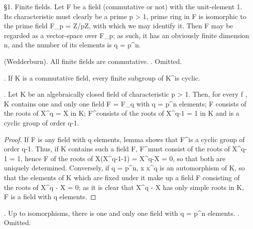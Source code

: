 
  \S 1. Finite fields. Let F be a field (commutative or not) with the
unit-element 1. Its characteristic must clearly be a prime p > 1, 
prime ring in F is isomorphic to the prime field \mathbf F_p = \mathbf Z/p\mathbf Z, with 
which we may identify it. Then F may be regarded as a vector-space over \mathbf F_p;  
as such, it has an obviously finite dimension n, and the number of its 
elements is q = p^n. 

\theorem (Wedderburn). All finite fields are commutative. 
\proof. Omitted.

\lemma. If K is a commutative field, every finite subgroup of K^\times is cyclic.

\theorem. Let K be an algebraically closed field of characteristic p > 1. 
Then, for every f , K contains one and only one field F = F_q with 
q = p^n elements; F consists of the roots of X^q = X in K; F^\times consists 
of the roots of X^{q-1} = 1 in K and is a cyclic group of order q-1. 

\begin{proof}
  If F is any field with q elements, lemma shows that F^\times is a cyclic 
group of order q-1. Thus, if K contains such a field F, F^\times must consist 
of the roots of X^{q-1} = 1, hence F of the roots of X(X^{q-1}-1) = X^q-X = 0, 
so that both are uniquely determined. 
  Conversely, if q = p^n, x \mapsto x^q is an automorphism of K, 
so that the elements of K which are fixed under it make up a field F 
consisting of the roots of X^q - X = 0; as it is clear that X^q - X 
has only simple roots in K, F is a field with q elements. 
\end{proof}

\corollary. Up to isomorphisms, there is one and only one field with q = p^n elements. 
\proof. Omitted.
